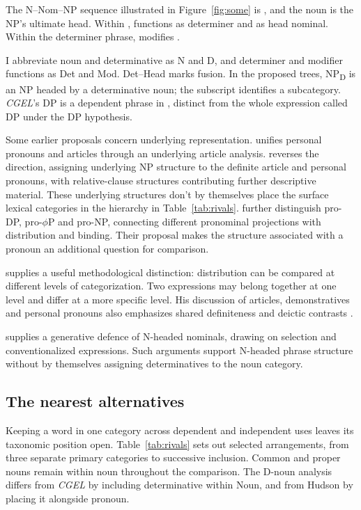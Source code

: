 \documentclass[12pt]{article}
\begin{document}
The N--Nom--NP sequence illustrated in Figure~\ref{fig:some} is , and the noun is the NP's ultimate head. Within ,  functions as determiner and  as head nominal. Within the determiner phrase,  modifies .

I abbreviate noun and determinative as N and D, and determiner and modifier functions as Det and Mod. Det--Head marks fusion. In the proposed trees, NP\textsubscript{D} is an NP headed by a determinative noun; the subscript identifies a subcategory. \textit{CGEL}'s DP is a dependent phrase in , distinct from the whole expression called DP under the DP hypothesis.

Some earlier proposals concern underlying representation. \textcite{postal1966} unifies personal pronouns and articles through an underlying article analysis. \textcite[197--203]{sommerstein1972} reverses the direction, assigning underlying NP structure to the definite article and personal pronouns, with relative-clause structures contributing further descriptive material. These underlying structures don't by themselves place the surface lexical categories in the hierarchy in Table~\ref{tab:rivals}. \textcite{dechainewiltschko2002} further distinguish pro-DP, pro-$\phi$P and pro-NP, connecting different pronominal projections with distribution and binding. Their proposal makes the structure associated with a pronoun an additional question for comparison.

\textcite[232--235]{lyons1968} supplies a useful methodological distinction: distribution can be compared at different levels of categorization. Two expressions may belong together at one level and differ at a more specific level. His discussion of articles, demonstratives and personal pronouns also emphasizes shared definiteness and deictic contrasts \citep[279]{lyons1968}.

\textcite{bruening2020nominal} supplies a generative defence of N-headed nominals, drawing on selection and conventionalized expressions. Such arguments support N-headed phrase structure without by themselves assigning determinatives to the noun category.

\subsection{The nearest alternatives}

Keeping a word in one category across dependent and independent uses leaves its taxonomic position open. Table~\ref{tab:rivals} sets out selected arrangements, from three separate primary categories to successive inclusion. Common and proper nouns remain within noun throughout the comparison. The D-noun analysis differs from \textit{CGEL} by including determinative within Noun, and from Hudson by placing it alongside pronoun.
\end{document}
